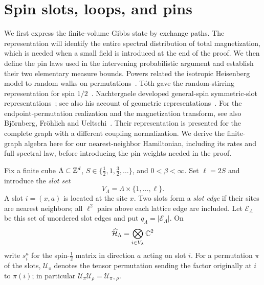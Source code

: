 \section{Spin slots, loops, and pins}\label{sec:loops}

We first express the finite-volume Gibbs state by exchange paths.  The
representation will identify the entire spectral distribution of total
magnetization, which is needed when a small field is introduced at the end
of the proof.  We then define the pin laws used in the intervening
probabilistic argument and establish their two elementary measure bounds.
Powers related the isotropic Heisenberg model to random walks on
permutations~\cite{Powers1976}.  T\'oth gave the random-stirring
representation for spin $1/2$~\cite{Toth1993}.  Nachtergaele developed
general-spin symmetric-slot representations~\cite[Section~2.2,
equations~(2.23)--(2.25), and Theorem~2.4]{Nachtergaele1994Quasistates};
see also his account of geometric representations~\cite{Nachtergaele1994Stochastic}.
For the endpoint-permutation realization and the magnetization
transform, see also Bj\"ornberg, Fr\"ohlich and
Ueltschi~\cite[Section~3.2, Proposition~3.2 and equation~(3.19)]{BjornbergFrohlichUeltschi2020}.
Their representation is presented for the complete graph with a different
coupling normalization.  We derive the finite-graph algebra here for
our nearest-neighbor Hamiltonian, including its rates and full spectral
law, before introducing the pin weights needed in the proof.

Fix a finite cube $\Lambda\subset\mathbb Z^d$, $S\in\{\tfrac12,1,\tfrac32,\ldots\}$,
and $0<\beta<\infty$.  Set $\ell=2S$ and introduce the \emph{slot set}
\[
 V_\Lambda=\Lambda\times\{1,\ldots,\ell\}.
\]
A slot $i=(x,a)$ is located at the site $x$.  Two slots form a
\emph{slot edge} if their sites are nearest neighbors; all $\ell^2$ pairs
above each lattice edge are included.  Let $\mathcal E_\Lambda$ be this
set of unordered slot edges and put $q_\Lambda=|\mathcal E_\Lambda|$.
On
\[
 \widehat{\mathcal H}_\Lambda
   =\bigotimes_{i\in V_\Lambda}\mathbb C^2
\]
write $s_i^a$ for the spin-$\tfrac12$ matrix in direction $a$ acting on
slot $i$.  For a permutation $\pi$ of the slots, $\mathcal U_\pi$ denotes
the tensor permutation sending the factor originally at $i$ to
$\pi(i)$; in particular
$\mathcal U_\pi\mathcal U_\rho=\mathcal U_{\pi\circ\rho}$.

